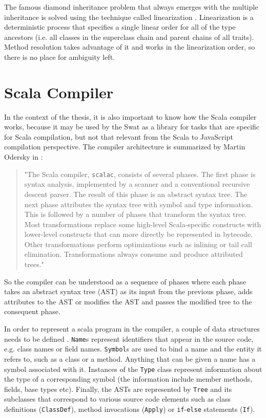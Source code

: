 \documentclass[12pt,a4paper]{report}
\begin{document}
The famous diamond inheritance problem that always emerges with the multiple inheritance is solved using the technique called linearization \cite{Linearization}. Linearization is a deterministic process that specifies a single linear order for all of the type ancestors (i.e. all classes in the superclass chain and parent chains of all traits). Method resolution takes advantage of it and works in the linearization order, so there is no place for ambiguity left.

\section{Scala Compiler}
\label{sec:ScalaCompiler}

In the context of the thesis, it is also important to know how the Scala compiler works, because it may be used by the Swat as a library for tasks that are specific for Scala compilation, but not that relevant from the Scala to JavaScript compilation perspective. The compiler architecture is summarized by Martin Odersky in  \cite{ScalableComponents}:

\begin{quote}
"The Scala compiler, \texttt{scalac}, consists of several phases. The first phase is syntax analysis, implemented by a scanner and a conventional recursive descent parser. The result of this phase is an abstract syntax tree. The next phase attributes the syntax tree with symbol and type information. This is followed by a number of phases that transform the syntax tree. Most transformations replace some high-level Scala-specific constructs with lower-level constructs that can more directly be represented in bytecode. Other transformations perform optimizations such as inlining or tail call elimination. Transformations always consume and produce attributed trees."
\end{quote}

So the compiler can be understood as a sequence of phases where each phase takes an abstract syntax tree (AST) as its input from the previous phase, adds attributes to the AST or modifies the AST and passes the modified tree to the consequent phase.

In order to represent a scala program in the compiler, a couple of data structures needs to be defined \cite{Reflection}. \texttt{Name}s represent identifiers that appear in the source code, e.g. class names or field names. \texttt{Symbol}s are used to bind a name and the entity it refers to, such as a class or a method. Anything that can be given a name has a symbol associated with it. Instances of the \texttt{Type} class represent information about the type of a corresponding symbol (the information include member methods, fields, base types etc). Finally, the ASTs are represented by \texttt{Tree} and its subclasses that correspond to various source code elements such as class definitions (\texttt{ClassDef}), method invocations (\texttt{Apply}) or \texttt{if}-\texttt{else} statements (\texttt{If}).
\end{document}
